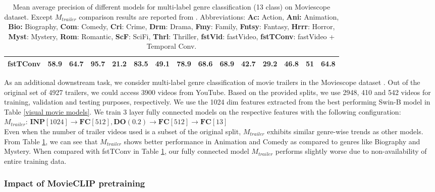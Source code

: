 \begin{table}[h!]
{\begin{tabular}{|c|c|c|c|c|c|c|c|c|c|c|c|c|c|c|}
fstTConv \cite{2019Moviescope} & 58.9             & 64.7        & 95.7         & 21.2         & 83.5         & 49.1         & 78.9         & 68.6         & 68.9           & 42.7          & 29.2          & 46.8         & 51           & 64.8          \\ \hline
\end{tabular}
}
\vspace{5mm}
\caption{Mean average precision of different models for multi-label genre classification (13 class) on Moviescope dataset. Except $M_{trailer}$ comparison results are reported from \cite{2019Moviescope}. Abbreviations: \textbf{Ac:} Action, \textbf{Ani:} Animation, \textbf{Bio:} Biography, \textbf{Com}: Comedy, \textbf{Cri}: Crime, \textbf{Drm}: Drama, \textbf{Fmy}: Family, \textbf{Fntsy}: Fantasy, \textbf{Hrrr}: Horror, \textbf{Myst}: Mystery, \textbf{Rom}: Romantic, \textbf{ScF}: SciFi, \textbf{Thrl}: Thriller, \textbf{fstVid}: fastVideo, \textbf{fstTConv}: fastVideo + Temporal Conv. }
\label{genre}
\end{table}
As an additional downstream task, we consider multi-label genre classification of movie trailers in the Moviescope dataset \cite{2019Moviescope}. Out of the original set of 4927 trailers, we could access 3900 videos from YouTube. Based on the provided splits, we use 2948, 410 and 542 videos for training, validation and testing purposes, respectively. We use the 1024 dim features extracted from the best performing Swin-B model in Table \ref{visual movie models}.
We train 3 layer fully connected models on the respective features with the following configuration:\\
\textit{$M_{trailer}$}: $\textbf{INP}[1024]\rightarrow{} \textbf{FC}[512],\textbf{DO}(0.2)\rightarrow{}\textbf{FC}[512]\rightarrow{}\textbf{FC}[13]$\\
Even when the number of trailer videos used is a subset of the original split, $M_{trailer}$ exhibits similar genre-wise trends as other models. From Table \ref{genre}, we can see that $M_{trailer}$ shows better performance in Animation and Comedy as compared to genres like Biography and Mystery. When compared with fstTConv in Table \ref{genre}, our fully connected model $M_{trailer}$ performs slightly worse due to non-availability of entire training data. 

\subsubsection{Impact of MovieCLIP pretraining}


